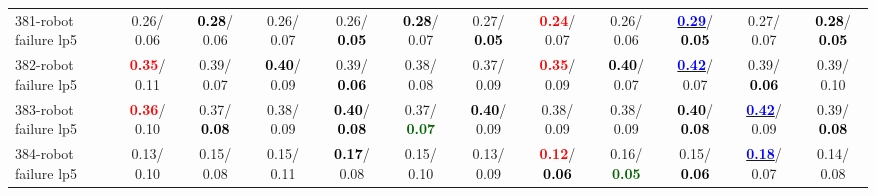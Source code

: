\begin{table}[h]
\begin{center}
{\begin{tabular}{lc|c|c|c|c|c|c|c|c|c|c}
381-robot failure lp5 &   0.26/  0.06 & \textcolor{black}{\textbf{  0.28}}/  0.06 &   0.26/  0.07 &   0.26/\textcolor{black}{\textbf{  0.05}} & \textcolor{black}{\textbf{  0.28}}/  0.07 &   0.27/\textcolor{black}{\textbf{  0.05}} & \textcolor{red}{\textbf{  0.24}}/  0.07 &   0.26/  0.06 & \underline{\textcolor{blue}{\textbf{  0.29}}}/\textcolor{black}{\textbf{  0.05}} &   0.27/  0.07 & \textcolor{black}{\textbf{  0.28}}/\textcolor{black}{\textbf{  0.05}} \\
382-robot failure lp5 & \textcolor{red}{\textbf{  0.35}}/  0.11 &   0.39/  0.07 & \textcolor{black}{\textbf{  0.40}}/  0.09 &   0.39/\textcolor{black}{\textbf{  0.06}} &   0.38/  0.08 &   0.37/  0.09 & \textcolor{red}{\textbf{  0.35}}/  0.09 & \textcolor{black}{\textbf{  0.40}}/  0.07 & \underline{\textcolor{blue}{\textbf{  0.42}}}/  0.07 &   0.39/\textcolor{black}{\textbf{  0.06}} &   0.39/  0.10 \\
383-robot failure lp5 & \textcolor{red}{\textbf{  0.36}}/  0.10 &   0.37/\textcolor{black}{\textbf{  0.08}} &   0.38/  0.09 & \textcolor{black}{\textbf{  0.40}}/\textcolor{black}{\textbf{  0.08}} &   0.37/\textcolor{darkgreen}{\textbf{  0.07}} & \textcolor{black}{\textbf{  0.40}}/  0.09 &   0.38/  0.09 &   0.38/  0.09 & \textcolor{black}{\textbf{  0.40}}/\textcolor{black}{\textbf{  0.08}} & \underline{\textcolor{blue}{\textbf{  0.42}}}/  0.09 &   0.39/\textcolor{black}{\textbf{  0.08}} \\
384-robot failure lp5 &   0.13/  0.10 &   0.15/  0.08 &   0.15/  0.11 & \textcolor{black}{\textbf{  0.17}}/  0.08 &   0.15/  0.10 &   0.13/  0.09 & \textcolor{red}{\textbf{  0.12}}/\textcolor{black}{\textbf{  0.06}} &   0.16/\textcolor{darkgreen}{\textbf{  0.05}} &   0.15/\textcolor{black}{\textbf{  0.06}} & \underline{\textcolor{blue}{\textbf{  0.18}}}/  0.07 &   0.14/  0.08 \\\end{tabular}}\label{stratsALCKappa11AllReduxHalfa}
\end{center}
\end{table}
